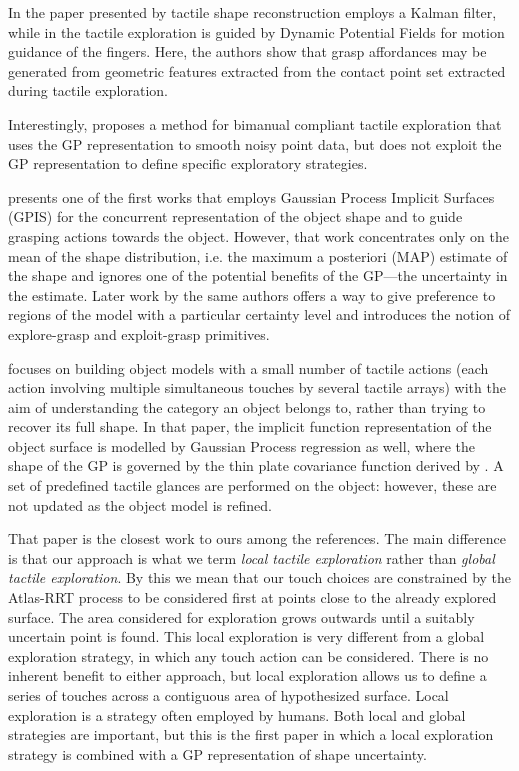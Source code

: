 In the paper presented by \citet{Meier2011Probabilistic} tactile shape reconstruction employs a Kalman filter, while in \citet{Bierbaum2008Potential} the tactile exploration is guided by Dynamic Potential Fields for motion guidance
of the fingers. Here, the authors show that grasp affordances may be generated from geometric features extracted from the contact point set extracted during tactile exploration.

Interestingly, \citet{Sommer2014Bimanual} proposes a method for bimanual compliant tactile exploration that uses the GP representation to smooth noisy point data, but does not exploit the GP representation to define specific exploratory strategies.

\cite{Dragiev2011Gaussian} presents one of the first works that employs Gaussian Process Implicit Surfaces (GPIS) for the concurrent representation of the object shape and to guide grasping actions towards the object. However, that work concentrates only on the mean of the shape distribution, i.e. the maximum a posteriori (MAP) estimate of the shape and ignores one of the potential benefits of the GP---the uncertainty in the estimate. Later work by the same authors \citep{Dragiev2013Uncertainty} offers a way to give preference to regions of the model with a particular certainty level and introduces the notion of explore-grasp and exploit-grasp primitives.

\citet{Bjorkman2013Enhancing} focuses on building object models with a small number of tactile actions (each action involving multiple simultaneous touches by several tactile arrays) with the aim of understanding the category an object belongs to, rather than trying to recover its full shape. In that paper, the implicit function representation of the object surface is modelled by Gaussian Process regression as well, where the shape of the GP is governed by the thin plate covariance function derived by \citet{Williams2007Gaussian}. A set of predefined tactile glances are performed on the object: however, these are not updated as the object model is refined. 

That paper is the closest work to ours among the references. The main difference is that our approach is what we term {\em local tactile exploration} rather than {\em global tactile exploration}. By this we mean that our touch choices are constrained by the Atlas-RRT process to be considered first at points close to the already explored surface. The area considered for exploration grows outwards until a suitably uncertain point is found. This local exploration is very different from a global exploration strategy, in which any touch action can be considered. There is no inherent benefit to either approach, but local exploration allows us to define a series of touches across a contiguous area of hypothesized surface. Local exploration is a strategy often employed by humans. Both local and global strategies are important, but this is the first paper in which a local exploration strategy is combined with a GP representation of shape uncertainty. 

